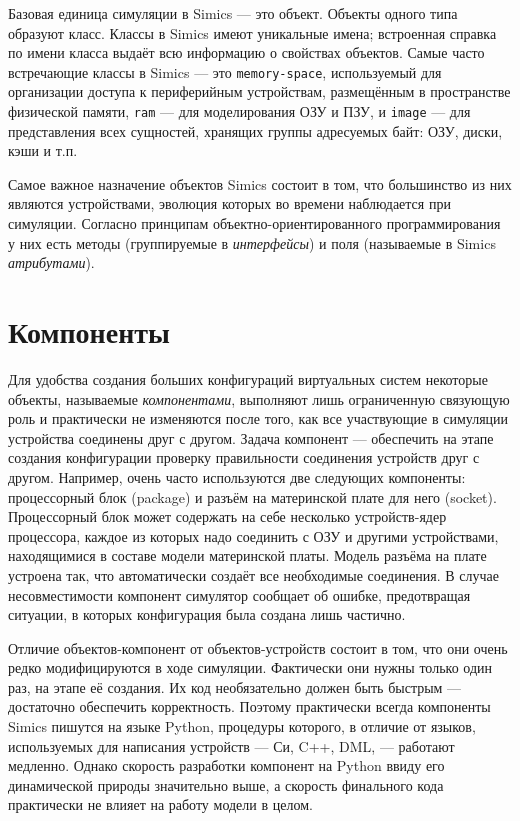 Базовая единица симуляции в Simics --- это объект. Объекты одного типа образуют класс. Классы в Simics имеют уникальные имена; встроенная справка по имени класса выдаёт всю информацию о свойствах объектов. Самые часто встречающие классы в Simics --- это \texttt{memory-space}, используемый для организации доступа к периферийным устройствам, размещённым в пространстве физической памяти, \texttt{ram} --- для моделирования ОЗУ и ПЗУ, и \texttt{image} --- для представления всех сущностей, хранящих группы адресуемых байт: ОЗУ, диски, кэши и т.п.

Самое важное назначение объектов Simics состоит в том, что большинство из них являются устройствами, эволюция которых во времени наблюдается при симуляции. Согласно принципам объектно-ориентированного программирования у них есть методы (группируемые в \textit{интерфейсы}) и поля (называемые в Simics \textit{атрибутами}).

\section{Компоненты}
Для удобства создания больших конфигураций виртуальных систем некоторые объекты, называемые \textit{компонентами}, выполняют лишь ограниченную связующую роль и практически не изменяются после того, как все участвующие в симуляции устройства соединены друг с другом. Задача компонент --- обеспечить на этапе создания конфигурации проверку правильности соединения устройств друг с другом. Например, очень часто используются две следующих компоненты: процессорный блок (\abbr package) и разъём на материнской плате для него (\abbr socket). Процессорный блок может содержать на себе несколько устройств-ядер процессора, каждое из которых надо соединить с ОЗУ и другими устройствами, находящимися в составе модели материнской платы. Модель разъёма на плате устроена так, что автоматически создаёт все необходимые соединения. В случае несовместимости компонент симулятор сообщает об ошибке, предотвращая ситуации, в которых конфигурация была создана лишь частично.

Отличие объектов-компонент от объектов-устройств состоит в том, что они очень редко модифицируются в ходе симуляции. Фактически они нужны только один раз, на этапе её создания. Их код необязательно должен быть быстрым --- достаточно обеспечить корректность. Поэтому практически всегда компоненты Simics пишутся на языке Python, процедуры которого, в отличие от языков, используемых для написания устройств --- Си, C++, DML, --- работают медленно. Однако скорость разработки компонент на Python ввиду его динамической природы значительно выше, а скорость финального кода практически не влияет на работу модели в целом.

